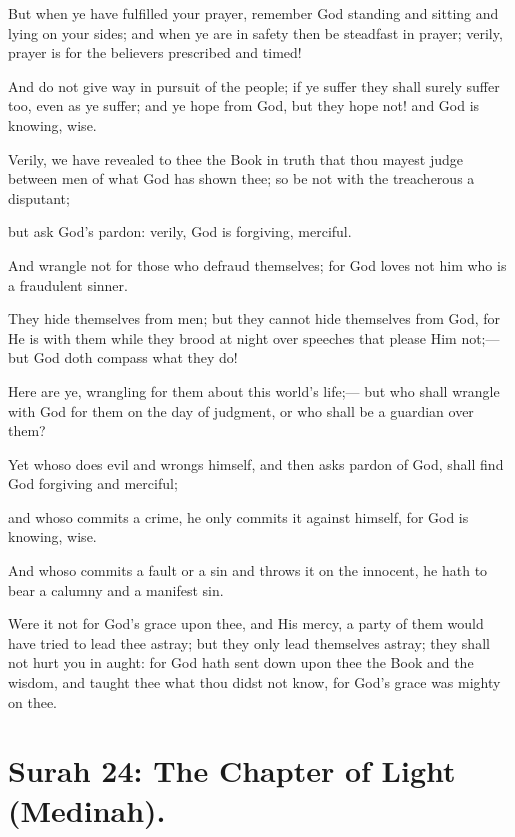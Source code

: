 \documentclass[fontsize=14pt, letterpaper, notitlepage, openany, DIV=12]{scrbook} %
\begin{document}
\noindent[4:103]
But when ye have fulfilled your prayer, remember God standing and sitting and lying on
your sides; and when ye are in safety then be steadfast in prayer; verily, prayer is for the
believers prescribed and timed!

\noindent[4:104]
And do not give way in pursuit of the people; if ye suffer they shall surely suffer too,
even as ye suffer; and ye hope from God, but they hope not! and God is knowing, wise.

\noindent[4:105]
Verily, we have revealed to thee the Book in truth that thou mayest judge between men of
what God has shown thee; so be not with the treacherous a disputant;

\noindent[4:106]
but ask God's pardon: verily, God is forgiving, merciful.

\noindent[4:107]
And wrangle not for those who defraud themselves; for God loves not him who is a
fraudulent sinner.

\noindent[4:108]
They hide themselves from men; but they cannot hide themselves from God, for He is
with them while they brood at night over speeches that please Him not;--- but God doth compass
what they do!

\noindent[4:109]
Here are ye, wrangling for them about this world's life;--- but who shall wrangle with
God for them on the day of judgment, or who shall be a guardian over them?

\noindent[4:110]
Yet whoso does evil and wrongs himself, and then asks pardon of God, shall find God
forgiving and merciful;

\noindent[4:111]
and whoso commits a crime, he only commits it against himself, for God is knowing,
wise.

\noindent[4:112]
And whoso commits a fault or a sin and throws it on the innocent, he hath to bear a
calumny and a manifest sin.

\noindent[4:113]
Were it not for God's grace upon thee, and His mercy, a party of them would have tried
to lead thee astray; but they only lead themselves astray; they shall not hurt you in aught: for God
hath sent down upon thee the Book and the wisdom, and taught thee what thou didst not know,
for God's grace was mighty on thee.


\section{Surah 24: The Chapter of Light (Medinah).}
\end{document}
